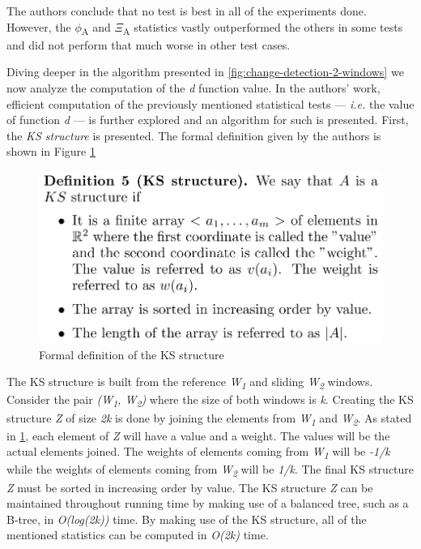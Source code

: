 The authors conclude that no test is best in all of the experiments done. However, the $\phi$\textsubscript{A} and $\Xi$\textsubscript{A} statistics vastly outperformed the others in some tests and did not perform that much worse in other test cases.

Diving deeper in the algorithm presented in \ref{fig:change-detection-2-windows} we now analyze the computation of the \textit{d} function value. In the authors' work, efficient computation of the previously mentioned statistical tests --- \textit{i.e.} the value of function \textit{d} --- is further explored and an algorithm for such is presented. First, the \textit{KS structure} is presented. The formal definition given by the authors is shown in Figure \ref{fig:ks-structure}


\begin{figure}[!htb]
    \begin{center}
      \includegraphics[scale=0.4]{figures/ks-structure.png}
      \caption{Formal definition of the KS structure}
      \label{fig:ks-structure}
    \end{center}
\end{figure}

The KS structure is built from the reference \textit{W\textsubscript{1}} and sliding \textit{W\textsubscript{2}} windows. Consider the pair \textit{(\textit{W\textsubscript{1}}, \textit{W\textsubscript{2}})} where the size of both windows is \textit{k}. Creating the KS structure \textit{Z} of size \textit{2k} is done by joining the elements from \textit{W\textsubscript{1}} and \textit{W\textsubscript{2}}. As stated in \ref{fig:ks-structure}, each element of \textit{Z} will have a value and a weight. The values will be the actual elements joined. The weights of elements coming from \textit{W\textsubscript{1}} will be \textit{-1/k} while the weights of elements coming from \textit{W\textsubscript{2}} will be \textit{1/k}. The final KS structure \textit{Z} must be sorted in increasing order by value. The KS structure \textit{Z} can be maintained throughout running time by making use of a balanced tree, such as a B-tree, in \textit{O(log(2k))} time. By making use of the KS structure, all of the mentioned statistics can be computed in \textit{O(2k)} time. 

